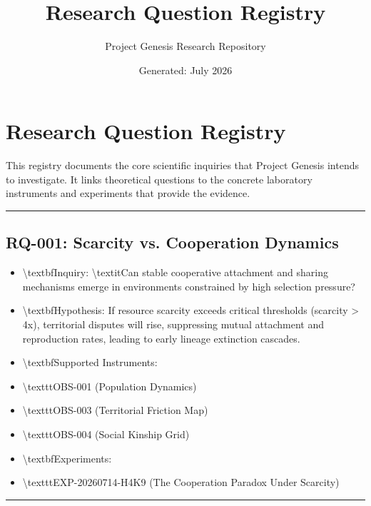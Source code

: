 \documentclass[11pt,a4paper]{article}
\title{\textbf{Research Question Registry}}
\author{Project Genesis Research Repository}
\date{\small Generated: July 2026}
\begin{document}
\maketitle
\thispagestyle{empty}

\newpage
\section*{Research Question Registry}

This registry documents the core scientific inquiries that Project Genesis intends to investigate. It links theoretical questions to the concrete laboratory instruments and experiments that provide the evidence.

\noindent\rule{\textwidth}{0.4pt}

\subsection*{RQ-001: Scarcity vs. Cooperation Dynamics}
\begin{itemize}
  \item \textbackslash{}textbf{Inquiry}: \textbackslash{}textit{Can stable cooperative attachment and sharing mechanisms emerge in environments constrained by high selection pressure?}
  \item \textbackslash{}textbf{Hypothesis}: If resource scarcity exceeds critical thresholds (scarcity \textgreater{} 4x), territorial disputes will rise, suppressing mutual attachment and reproduction rates, leading to early lineage extinction cascades.
  \item \textbackslash{}textbf{Supported Instruments}:
  \item \textbackslash{}texttt{OBS-001} (Population Dynamics)
  \item \textbackslash{}texttt{OBS-003} (Territorial Friction Map)
  \item \textbackslash{}texttt{OBS-004} (Social Kinship Grid)
  \item \textbackslash{}textbf{Experiments}:
  \item \textbackslash{}texttt{EXP-20260714-H4K9} (The Cooperation Paradox Under Scarcity)
\end{itemize}

\noindent\rule{\textwidth}{0.4pt}
\end{document}
